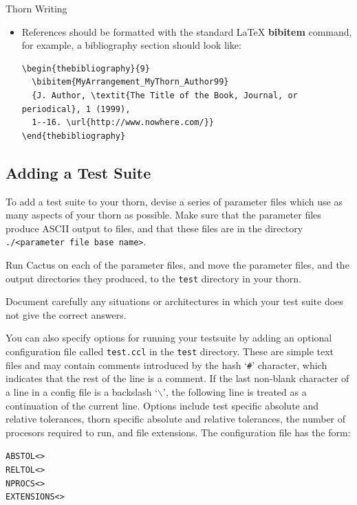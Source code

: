 \begin{cactuspart}{Thorn Writing}
\begin{itemize}
 \item References should be formatted with the standard LaTeX {\bf
        bibitem} command, for example, a bibliography section should
        look like:
%
\begin{verbatim}
\begin{thebibliography}{9}
  \bibitem{MyArrangement_MyThorn_Author99}
  {J. Author, \textit{The Title of the Book, Journal, or periodical}, 1 (1999),
  1--16. \url{http://www.nowhere.com/}}
\end{thebibliography}
\end{verbatim}

\end{itemize}


\subsection{Adding a Test Suite}
\label{sec:adding_test_suite}

To add a test suite to your thorn, devise a series of parameter
files which use as many aspects of your thorn as possible.
Make sure that the parameter files produce ASCII output to files,
and that these files are in the directory
\texttt{./<parameter file base name>}.

Run Cactus on each of the parameter files, and move the parameter files,
and the output directories they produced, to the \texttt{test} directory
in your thorn.

Document carefully any situations or architectures in which your test
suite does not give the correct answers.

You can also specify options for running your testsuite by adding an
optional configuration file called \texttt{test.ccl} in the \texttt{test}
directory. These are simple text files and may contain comments
introduced by the hash `\texttt{\#}' character, which indicates that the
rest of the line is a comment. If the last non-blank character of a
line in a config file is a backslash `\texttt{$\backslash$}', the
following line is treated as a continuation of the current line.
Options include test specific absolute and relative tolerances, thorn
specific absolute and relative tolerances, the number of procesors required
to run, and file extensions. The configuration file has the form:

\begin{alltt}
ABSTOL  <>
RELTOL  <>
NPROCS  <>
EXTENSIONS  <  >


\end{alltt}
\end{cactuspart}
